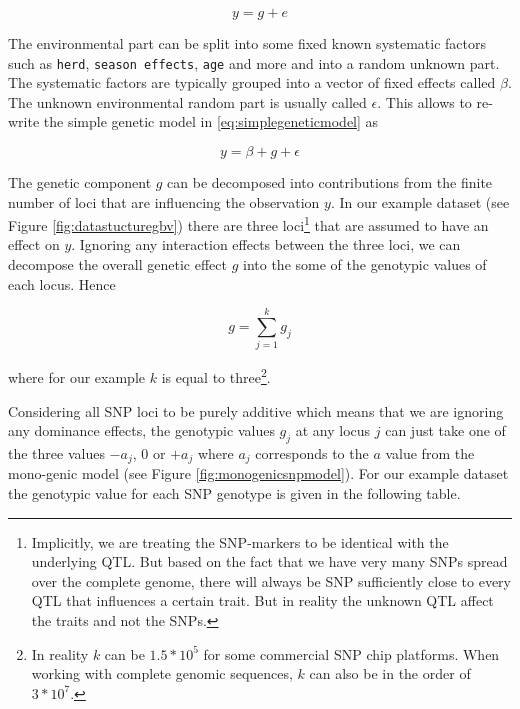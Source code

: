 \documentclass[]{book}
\theoremstyle{definition}
\theoremstyle{definition}
\theoremstyle{definition}
\theoremstyle{remark}
\begin{document}
\begin{equation}
  y = g + e
  \label{eq:simplegeneticmodel}
\end{equation}

The environmental part can be split into some fixed known systematic factors such as \texttt{herd}, \texttt{season\ effects}, \texttt{age} and more and into a random unknown part. The systematic factors are typically grouped into a vector of fixed effects called \(\beta\). The unknown environmental random part is usually called \(\epsilon\). This allows to re-write the simple genetic model in \eqref{eq:simplegeneticmodel} as

\begin{equation}
  y = \beta + g + \epsilon
  \label{eq:envdecompgeneticmodel}
\end{equation}

The genetic component \(g\) can be decomposed into contributions from the finite number of loci that are influencing the observation \(y\). In our example dataset (see Figure \ref{fig:datastucturegbv}) there are three loci\footnote{Implicitly, we are treating the SNP-markers to be identical with the underlying QTL. But based on the fact that we have very many SNPs spread over the complete genome, there will always be SNP sufficiently close to every QTL that influences a certain trait. But in reality the unknown QTL affect the traits and not the SNPs.} that are assumed to have an effect on \(y\). Ignoring any interaction effects between the three loci, we can decompose the overall genetic effect \(g\) into the some of the genotypic values of each locus. Hence

\begin{equation}
  g = \sum_{j=1}^k g_j
  \label{eq:decompgeneticeffect}
\end{equation}

where for our example \(k\) is equal to three\footnote{In reality \(k\) can be \(1.5*10^5\) for some commercial SNP chip platforms. When working with complete genomic sequences, \(k\) can also be in the order of \(3*10^7\).}.

Considering all SNP loci to be purely additive which means that we are ignoring any dominance effects, the genotypic values \(g_j\) at any locus \(j\) can just take one of the three values \(-a_j\), \(0\) or \(+a_j\) where \(a_j\) corresponds to the \(a\) value from the mono-genic model (see Figure \ref{fig:monogenicsnpmodel}). For our example dataset the genotypic value for each SNP genotype is given in the following table.
\end{document}
